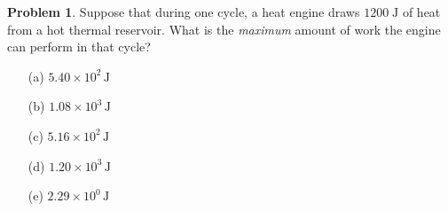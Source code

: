 \documentclass[10pt]{article}
\theoremstyle{definition} %
\newtheorem{problem}{Problem}
\theoremstyle{plain} %
\begin{document}
                                                    \begin{problem}
                                                      Suppose that during one cycle, a heat engine draws
                                                      \(1200\;\text{J}\) of heat from a hot thermal reservoir.
                                                      What is the \emph{maximum} amount of work the engine can perform in that cycle?
                                                      
                                                      \begin{enumerate}
                                                        \item[(a)] \(5.40\times10^{2}\,\text{J}\)
                                                        \item[(b)] \(1.08\times10^{3}\,\text{J}\)
                                                        \item[(c)] \(5.16\times10^{2}\,\text{J}\)
                                                        \item[(d)] \(1.20\times10^{3}\,\text{J}\)
                                                        \item[(e)] \(2.29\times10^{0}\,\text{J}\)
                                                      \end{enumerate}
                                                      \end{problem}
\end{document}
